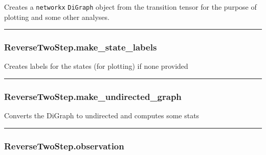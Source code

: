 Creates a \texttt{networkx} \texttt{DiGraph} object from the transition
tensor for the purpose of plotting and some other analyses.

\begin{center}\rule{0.5\linewidth}{\linethickness}\end{center}

\subsubsection{ReverseTwoStep.make\_state\_labels}\label{reversetwostep.make_state_labels}

\begin{Shaded}
\begin{Highlighting}[]
\NormalTok{)}
\end{Highlighting}
\end{Shaded}

Creates labels for the states (for plotting) if none provided

\begin{center}\rule{0.5\linewidth}{\linethickness}\end{center}

\subsubsection{ReverseTwoStep.make\_undirected\_graph}\label{reversetwostep.make_undirected_graph}

\begin{Shaded}
\begin{Highlighting}[]
\NormalTok{)}
\end{Highlighting}
\end{Shaded}

Converts the DiGraph to undirected and computes some stats

\begin{center}\rule{0.5\linewidth}{\linethickness}\end{center}

\subsubsection{ReverseTwoStep.observation}\label{reversetwostep.observation}

\begin{Shaded}
\begin{Highlighting}[]
\NormalTok{)}
\end{Highlighting}
\end{Shaded}

